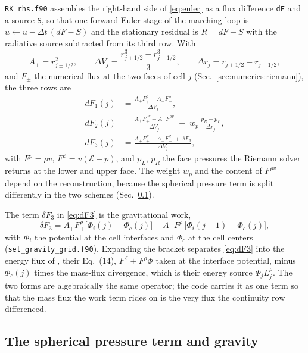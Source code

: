 \texttt{RK\_rhs.f90} assembles the right-hand side of \eqref{eq:euler} as a
flux difference \texttt{dF} and a source \texttt{S}, so that one forward
Euler stage of the marching loop is $u \leftarrow u - \Delta t\,(dF - S)$ and
the stationary residual is $R = dF - S$ with the radiative source subtracted
from its third row.  With
%
\begin{equation}
  A_\pm = r_{j\pm1/2}^2,\qquad
  \Delta V_j = \frac{r_{j+1/2}^3 - r_{j-1/2}^3}{3},\qquad
  \Delta r_j = r_{j+1/2} - r_{j-1/2},
  \label{eq:geom}
\end{equation}
%
and $F_\pm$ the numerical flux at the two faces of cell $j$
(Sec.~\ref{sec:numerics:riemann}), the three rows are
%
\begin{align}
  dF_1(j) &= \frac{A_+ F_+^{\rho} - A_- F_-^{\rho}}{\Delta V_j},
  \label{eq:dF1}\\
  dF_2(j) &= \frac{A_+ F_+^{\rho v} - A_- F_-^{\rho v}}{\Delta V_j}
             \;+\; w_p\,\frac{p_R - p_L}{\Delta r_j},
  \label{eq:dF2}\\
  dF_3(j) &= \frac{A_+ F_+^{\mathcal{E}} - A_- F_-^{\mathcal{E}}
             \;+\; \delta F_3}{\Delta V_j},
  \label{eq:dF3}
\end{align}
%
with $F^{\rho} = \rho v$, $F^{\mathcal{E}} = v(\mathcal{E}+p)$, and $p_L$, $p_R$ the face
pressures the Riemann solver returns at the lower and upper face.  The weight
$w_p$ and the content of $F^{\rho v}$ depend on the reconstruction, because
the spherical pressure term is split differently in the two schemes
(Sec.~\ref{sec:hydro:pressure}).

The term $\delta F_3$ in \eqref{eq:dF3} is the gravitational work,
%
\begin{equation}
  \delta F_3 = A_+ F_+^{\rho}\bigl[\Phi_i(j) - \Phi_c(j)\bigr]
             - A_- F_-^{\rho}\bigl[\Phi_i(j-1) - \Phi_c(j)\bigr],
  \label{eq:dF3p}
\end{equation}
%
with $\Phi_i$ the potential at the cell interfaces and $\Phi_c$ at the cell
centers (\texttt{set\_gravity\_grid.f90}).  Expanding the bracket separates
\eqref{eq:dF3} into the energy flux of \citet{Caldiroli2021}, their Eq.~(14),
$F^{\mathcal{E}} + F^{\rho}\Phi$ taken at the interface potential, minus
$\Phi_c(j)$ times the mass-flux divergence, which is their energy source
$\Phi_j L^\rho_j$.  The two forms are algebraically the same operator; the
code carries it as one term so that the mass flux the work term rides on is
the very flux the continuity row differenced.

\subsection{The spherical pressure term and gravity}
\label{sec:hydro:pressure}

